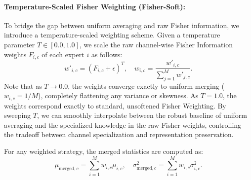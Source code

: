 \documentclass{article}
\theoremstyle{plain}
\theoremstyle{definition}
\theoremstyle{remark}
\begin{document}
\paragraph{Temperature-Scaled Fisher Weighting (Fisher-Soft):} 
To bridge the gap between uniform averaging and raw Fisher information, we introduce a temperature-scaled weighting scheme. Given a temperature parameter $T \in [0.0, 1.0]$, we scale the raw channel-wise Fisher Information weights $F_{i, c}$ of each expert $i$ as follows:
\begin{equation}
    w'_{i, c} = (F_{i, c} + \epsilon)^T, \quad w_{i, c} = \frac{w'_{i, c}}{\sum_{j=1}^M w'_{j, c}}.
\end{equation}
Note that as $T \to 0.0$, the weights converge exactly to uniform merging ($w_{i, c} = 1/M$), completely flattening any variance or skewness. As $T = 1.0$, the weights correspond exactly to standard, unsoftened Fisher Weighting. By sweeping $T$, we can smoothly interpolate between the robust baseline of uniform averaging and the specialized knowledge in the raw Fisher weights, controlling the tradeoff between channel specialization and representation preservation.

For any weighted strategy, the merged statistics are computed as:
\begin{equation}
    \mu_{\text{merged}, c} = \sum_{i=1}^M w_{i, c} \mu_{i, c}, \quad \sigma^2_{\text{merged}, c} = \sum_{i=1}^M w_{i, c} \sigma^2_{i, c}.
\end{equation}
\end{document}

